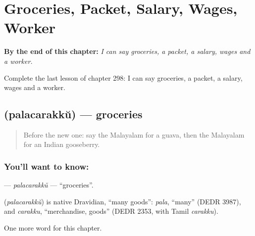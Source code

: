 
\chapter{Groceries, Packet, Salary, Wages, Worker}
\label{ch:ml-groceries-packet-salary-wages-worker}

\begin{chapteropening}
\textbf{By the end of this chapter:} \emph{I can say groceries, a packet, a salary, wages and a worker.}

Complete the last lesson of chapter 298: I can say groceries, a packet, a salary, wages and a worker.
\end{chapteropening}

\section[\texorpdfstring{\ml{പലചരക്ക്} (palacarakkŭ)}{പലചരക്ക് (palacarakkŭ)}]{ (palacarakkŭ) — groceries}

\label{lesson:ML-C298-palacarakku}



\begin{quote}
Before the new one: say the Malayalam for a guava, then the Malayalam for an Indian gooseberry.
\end{quote}

\subsection*{You'll want to know: }
\textbf{} — \emph{palacarakkŭ} — \textquotedblleft{}groceries\textquotedblright{}.

\begin{cousinweb}
\textbf{} (\emph{palacarakkŭ}) is native Dravidian, \textquotedblleft{}many goods\textquotedblright{}: \emph{pala}, \textquotedblleft{}many\textquotedblright{} (DEDR 3987), and \emph{carakku}, \textquotedblleft{}merchandise, goods\textquotedblright{} (DEDR 2353, with Tamil \emph{carakku}).
\end{cousinweb}

\begin{grammarlens}[title={What you've built}]
One more word for this chapter.
\end{grammarlens}

